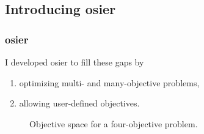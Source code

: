 

\subsection{Introducing \gls{osier}}
\begin{frame}
    \frametitle{\gls{osier}}
    I developed \gls{osier} to fill these gaps by \cite{dotson_osier_2024}
    \begin{enumerate}
        \item optimizing multi- and many-objective problems,
        \item allowing user-defined objectives.
    \end{enumerate}
    
    \begin{figure}
        \centering
        \resizebox{0.95\columnwidth}{!}{}
        \caption{Objective space for a four-objective problem.}
        \label{fig:4-obj-space}
    \end{figure}
\end{frame}

